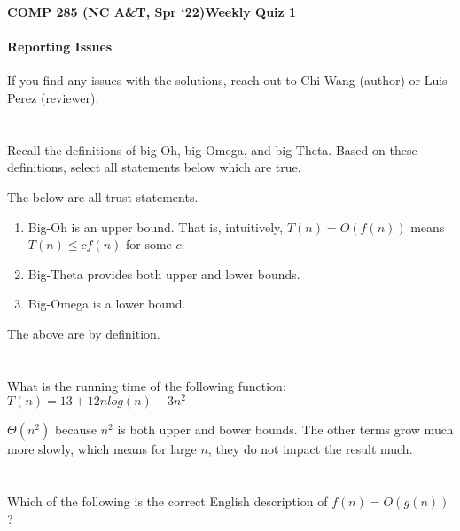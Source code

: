 \documentclass [12pt]{article}
\begin{document}
 

{\LARGE \textbf {COMP 285 (NC A\&T, Spr `22)}\hfill \textbf {Weekly Quiz 1} } 

\begin{Instruction}

\paragraph{Reporting Issues} If you find any issues with the solutions, reach out to Chi Wang (author) or Luis Perez (reviewer).

\end{Instruction}

\section{} Recall the definitions of big-Oh, big-Omega, and big-Theta. Based on these definitions, select all statements below which are true. 

\begin{Solution}
The below are all trust statements.
\begin{enumerate}
    \item Big-Oh is an upper bound. That is, intuitively, $T(n) = O(f(n))$ means $T(n) \leq c f(n)$ for some $c$. 
    \item Big-Theta provides both upper and lower bounds.
    \item Big-Omega is a lower bound.
\end{enumerate}

The above are by definition.
\end{Solution}


\section{} What is the running time of the following function:
$T(n) = 13 + 12nlog(n) + 3n^2$

\begin{Solution}
$\Theta(n^2)$ because $n^2$ is both upper and bower bounds. The other terms grow much more slowly, which means for large $n$, they do not impact the result much.
\end{Solution}


\section{} Which of the following is the correct English description of $f(n) = O(g(n))$?
\end{document}
